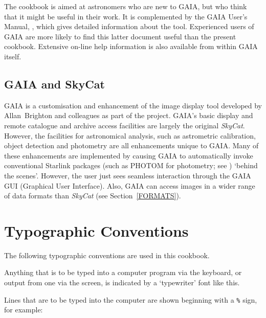\documentclass[twoside,11pt]{starlink}
\begin{document}
The cookbook is aimed at astronomers who are new to GAIA, but who think
that it might be useful in their work.  It is complemented by the GAIA
User's Manual, \/\cite{SUN214}, which gives detailed information
about the tool.  Experienced users of GAIA are more likely to find this
latter document useful than the present cookbook.  Extensive on-line
help information is also available from within GAIA itself.

\subsection{GAIA and SkyCat}

GAIA is a customisation and enhancement of the
image display tool developed by Allan~Brighton and colleagues as part
of the 
 project.  GAIA's basic
display and remote catalogue and archive access facilities are largely the
original \textit{SkyCat}.  However, the facilities for astronomical analysis,
such as astrometric calibration, object detection and photometry are
all enhancements unique to GAIA.  Many of these enhancements are
implemented by causing GAIA to automatically invoke conventional Starlink
packages (such as PHOTOM for photometry; see
\/\cite{SUN45}) `behind the scenes'.  However,
the user just sees seamless interaction through the GAIA GUI (Graphical
User Interface).  Also, GAIA can access images in a wider range of
data formats than \textit{SkyCat}\/ (see Section~\ref{FORMATS}).

\section{\label{TYPO}Typographic Conventions}

The following typographic conventions are used in this cookbook.

\begin{terminalv}
Anything that is to be typed into a computer program via the keyboard,
or output from one via the screen, is indicated by a `typewriter' font
like this.
\end{terminalv}

Lines that are to be typed into the computer are shown beginning with a
\texttt{\%} sign, for example:
\end{document}
